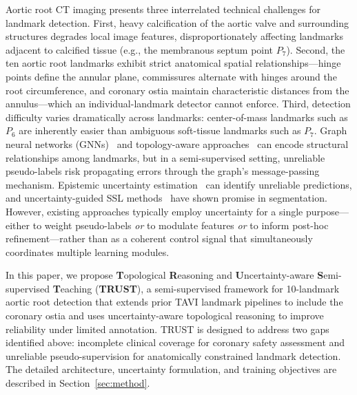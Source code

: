 \documentclass[conference]{IEEEtran}
\begin{document}
Aortic root CT imaging presents three interrelated technical challenges for landmark detection. First, heavy calcification of the aortic valve and surrounding structures degrades local image features, disproportionately affecting landmarks adjacent to calcified tissue (e.g., the membranous septum point $P_7$). Second, the ten aortic root landmarks exhibit strict anatomical spatial relationships---hinge points define the annular plane, commissures alternate with hinges around the root circumference, and coronary ostia maintain characteristic distances from the annulus---which an individual-landmark detector cannot enforce. Third, detection difficulty varies dramatically across landmarks: center-of-mass landmarks such as $P_6$ are inherently easier than ambiguous soft-tissue landmarks such as $P_7$. Graph neural networks (GNNs)~\cite{Scarselli2009_gnn,Kipf2017_gcn} and topology-aware approaches~\cite{Li2020_structured_landmark,Lang2020_gcn_landmark} can encode structural relationships among landmarks, but in a semi-supervised setting, unreliable pseudo-labels risk propagating errors through the graph's message-passing mechanism. Epistemic uncertainty estimation~\cite{Gal2016_dropout_uncertainty,Kendall2017_uncertainty} can identify unreliable predictions, and uncertainty-guided SSL methods~\cite{Yu2019_uncertainty_aware,Wang2022_u2pl} have shown promise in segmentation. However, existing approaches typically employ uncertainty for a single purpose---either to weight pseudo-labels \emph{or} to modulate features \emph{or} to inform post-hoc refinement---rather than as a coherent control signal that simultaneously coordinates multiple learning modules.

In this paper, we propose \textbf{T}opological \textbf{R}easoning and \textbf{U}ncertainty-aware \textbf{S}emi-supervised \textbf{T}eaching (\textbf{TRUST}), a semi-supervised framework for 10-landmark aortic root detection that extends prior TAVI landmark pipelines to include the coronary ostia and uses uncertainty-aware topological reasoning to improve reliability under limited annotation. TRUST is designed to address two gaps identified above: incomplete clinical coverage for coronary safety assessment and unreliable pseudo-supervision for anatomically constrained landmark detection. The detailed architecture, uncertainty formulation, and training objectives are described in Section~\ref{sec:method}.
\end{document}
